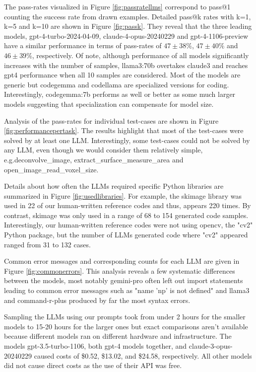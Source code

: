 \documentclass{ecai}
\begin{document}
The pass-rates visualized in Figure \ref{fig:passratellms} correspond to pass@1 counting the success rate from drawn examples. Detailed pass@k rates with k=1, k=5 and k=10 are shown in Figure \ref{fig:passk}. They reveal that the three leading models, gpt-4-turbo-2024-04-09, claude-4-opus-20240229 and gpt-4-1106-preview have a similar performance in terms of pass-rates of $47\pm38\%$, $47\pm40\%$ and $46\pm39\%$, respectively. Of note, although performance of all models significantly increases with the number of samples, llama3:70b overtakes claude3 and reaches gpt4 performance when all 10 samples are considered. Most of the models are generic but codegemma and codellama are specialized versions for coding. Interestingly, codegemma:7b performs as well or better as some much larger models suggesting that specialization can compensate for model size.

Analysis of the pass-rates for individual test-cases are shown in Figure \ref{fig:performancepertask}. The results highlight that most of the test-cases were solved by at least one LLM. Interestingly, some test-cases could not be solved by any LLM, even though we would consider them relatively simple, e.g.deconvolve\_image, extract\_surface\_measure\_area and open\_image\_read\_voxel\_size.

Details about how often the LLMs required specific Python libraries are summarized in Figure \ref{fig:usedlibraries}. For example, the skimage library was used in 22 of our human-written reference codes and thus, appears 220 times. By contrast, skimage was only used in a range of 68 to 154 generated code samples. Interestingly, our human-written reference codes were not using opencv, the "cv2" Python package, but the number of LLMs generated code where "cv2" appeared ranged from 31 to 132 cases.

Common error messages and corresponding counts for each LLM are given in Figure \ref{fig:commonerrors}. This analysis reveals a few systematic differences between the models, most notably gemini-pro often left out import statements leading to common error messages such as "name 'np' is not defined" and llama3 and command-r-plus produced by far the most syntax errors. 

Sampling the LLMs using our prompts took from under 2 hours for the smaller models to 15-20 hours for the larger ones but exact comparisons aren't available because different models ran on different hardware and infrastructure. The models gpt-3.5-turbo-1106, both gpt-4 models together, and claude-3-opus-20240229 caused costs of \$0.52, \$13.02, and \$24.58, respectively. All other models did not cause direct costs as the use of their API was free. 
\end{document}

